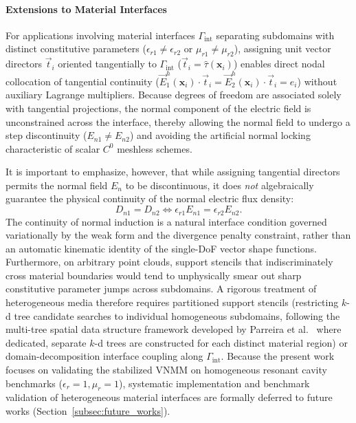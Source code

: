 \documentclass[preprint,12pt]{elsarticle}
\begin{document}
\paragraph{Extensions to Material Interfaces}
For applications involving material interfaces $\Gamma_{\text{int}}$ separating subdomains with distinct constitutive parameters ($\epsilon_{r1} \neq \epsilon_{r2}$ or $\mu_{r1} \neq \mu_{r2}$), assigning unit vector directors $\vec{t}_i$ oriented tangentially to $\Gamma_{\text{int}}$ ($\vec{t}_i = \hat{\tau}(\mathbf{x}_i)$) enables direct nodal collocation of tangential continuity ($\vec{E}^h_1(\mathbf{x}_i) \cdot \vec{t}_i = \vec{E}^h_2(\mathbf{x}_i) \cdot \vec{t}_i = e_i$) without auxiliary Lagrange multipliers. Because degrees of freedom are associated solely with tangential projections, the normal component of the electric field is unconstrained across the interface, thereby allowing the normal field to undergo a step discontinuity ($E_{n1} \neq E_{n2}$) and avoiding the artificial normal locking characteristic of scalar $C^0$ meshless schemes.

It is important to emphasize, however, that while assigning tangential directors permits the normal field $E_n$ to be discontinuous, it does \emph{not} algebraically guarantee the physical continuity of the normal electric flux density:
\begin{equation}
    D_{n1} = D_{n2} \iff \epsilon_{r1} E_{n1} = \epsilon_{r2} E_{n2}.
\end{equation}
The continuity of normal induction is a natural interface condition governed variationally by the weak form and the divergence penalty constraint, rather than an automatic kinematic identity of the single-DoF vector shape functions. Furthermore, on arbitrary point clouds, support stencils that indiscriminately cross material boundaries would tend to unphysically smear out sharp constitutive parameter jumps across subdomains. A rigorous treatment of heterogeneous media therefore requires partitioned support stencils (restricting $k$-d tree candidate searches to individual homogeneous subdomains, following the multi-tree spatial data structure framework developed by Parreira et al.~\cite{parreira2006efficient} where dedicated, separate $k$-d trees are constructed for each distinct material region) or domain-decomposition interface coupling along $\Gamma_{\text{int}}$. Because the present work focuses on validating the stabilized VNMM on homogeneous resonant cavity benchmarks ($\epsilon_r = 1, \mu_r = 1$), systematic implementation and benchmark validation of heterogeneous material interfaces are formally deferred to future works (Section~\ref{subsec:future_works}).
\end{document}
